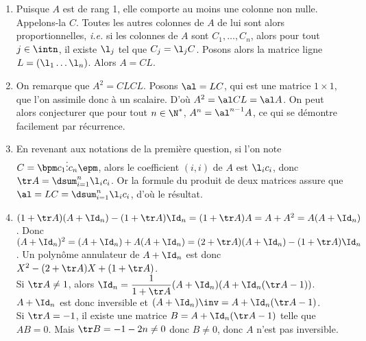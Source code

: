 \begin{enumerate}
    \item Puisque $A$ est de rang 1, elle comporte au moins une colonne non nulle. Appelons-la $C$. Toutes les autres colonnes de $A$ de lui sont alors proportionnelles, \emph{i.e.} si les colonnes de $A$ sont $C_1,\ldots,C_n$, alors pour tout $j\in\intn$, il existe $\l_j$ tel que $C_j=\l_jC$. Posons alors la matrice ligne $L=(\l_1\ldots\l_n)$. Alors $A=CL$.
    \item On remarque que $A^2=CLCL$. Posons $\al=LC$, qui est une matrice $1\times1$, que l'on assimile donc à un scalaire. D'où $A^2=\al CL=\al A$. On peut alors conjecturer que pour tout $n\in\N^*$, $A^n=\al^{n-1}A$, ce qui se démontre facilement par récurrence.
    \item En revenant aux notations de la première question, si l'on note $C=\bpm c_1\\\vdots\\c_n\epm$, alors le coefficient $(i,i)$ de $A$ est $\l_ic_i$, donc $\tr A=\dsum_{i=1}^n \l_ic_i$. Or la formule du produit de deux matrices assure que $\al=LC=\dsum_{i=1}^n \l_ic_i$, d'où le résultat.
    \item $(1+\tr A)(A+\Id_n)-(1+\tr A)\Id_n=(1+\tr A)A=A+A^2=A(A+\Id_n)$. Donc $(A+\Id_n)^2=(A+\Id_n)+A(A+\Id_n)=(2+\tr A)(A+\Id_n)-(1+\tr A)\Id_n$. Un polynôme annulateur de $A+\Id_n$ est donc $X^2-(2+\tr A)X+(1+\tr A)$.\\
    Si $\tr A\neq 1$, alors $\Id_n=\dfrac{1}{1+\tr A}(A+\Id_n)(A+\Id_n(\tr A-1))$. $A+\Id_n$ est donc inversible et $(A+\Id_n)\inv=A+\Id_n(\tr A-1)$.\\
    Si $\tr A=-1$, il existe une matrice $B=A+\Id_n(\tr A-1)$ telle que $AB=0$. Mais $\tr B=-1-2n\neq 0$ donc $B\neq 0$, donc $A$ n'est pas inversible.
\end{enumerate}
